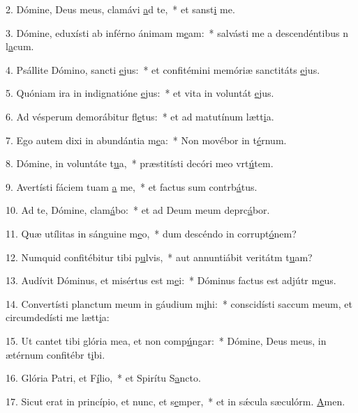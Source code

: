 2. Dómine, Deus meus, clamávi \uline{a}d te,~* et sanst\uline{i} me.\par 
3. Dómine, eduxísti ab inférno ánimam m\uline{e}am:~* salvásti me a descendéntibus n l\uline{a}cum.\par 
4. Psállite Dómino, sancti \uline{e}jus:~* et confitémini memóriæ sanctitáts \uline{e}jus.\par 
5. Quóniam ira in indignatióne \uline{e}jus:~* et vita in voluntát \uline{e}jus.\par 
6. Ad vésperum demorábitur fl\uline{e}tus:~* et ad matutínum lætt\uline{i}a.\par 
7. Ego autem dixi in abundántia m\uline{e}a:~* Non movébor in t\uline{é}rnum.\par 
8. Dómine, in voluntáte t\uline{u}a,~* præstitísti decóri meo vrt\uline{ú}tem.\par 
9. Avertísti fáciem tuam \uline{a} me,~* et factus sum contrb\uline{á}tus.\par 
10. Ad te, Dómine, clam\uline{á}bo:~* et ad Deum meum deprc\uline{á}bor.\par 
11. Quæ utílitas in sánguine m\uline{e}o,~* dum descéndo in corrupt\uline{ó}nem?\par 
12. Numquid confitébitur tibi p\uline{u}lvis,~* aut annuntiábit veritátm t\uline{u}am?\par 
13. Audívit Dóminus, et misértus est m\uline{e}i:~* Dóminus factus est adjútr m\uline{e}us.\par 
14. Convertísti planctum meum in gáudium m\uline{i}hi:~* conscidísti saccum meum, et circumdedísti me lætt\uline{i}a:\par 
15. Ut cantet tibi glória mea, et non comp\uline{ú}ngar:~* Dómine, Deus meus, in ætérnum confitébr t\uline{i}bi.\par 
16. Glória Patri, et F\uline{í}lio,~* et Spirítu S\uline{a}ncto.\par 
17. Sicut erat in princípio, et nunc, et s\uline{e}mper,~* et in sǽcula sæculórm. \uline{A}men.\par 
